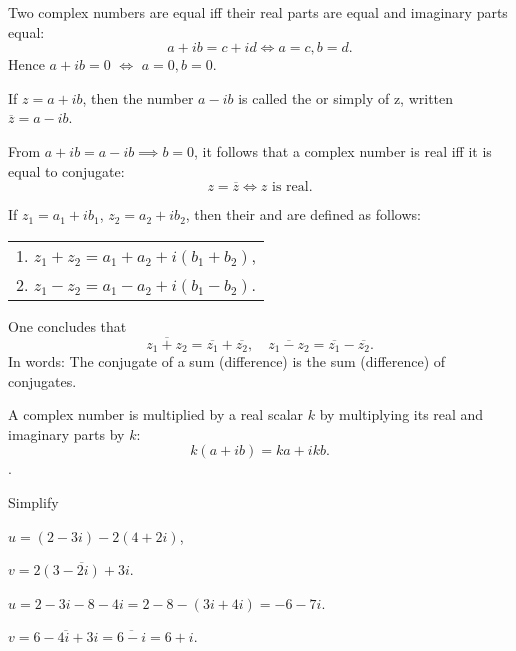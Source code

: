 \documentclass[11pt]{amsbook}
\begin{document}
\begin{defn}[Equality]
	Two complex numbers are equal 
	iff 
	their real parts are equal and imaginary parts equal:
	\[
		a + ib = c + id  
		\iff
		a = c, b = d.
	\]
	Hence $a + ib = 0$ $\iff$  $a = 0, b = 0$.
\end{defn}

\begin{defn}[Conjugation]
	If $z = a + ib$, then the number $a - ib$ is called the 
	 or simply 
	 of z, 
	written $\overline{z} =a - ib$. 
\end{defn}

From $a +ib = a - ib \implies b = 0$, it follows that a complex number is real iff it is equal to conjugate:
\[
	z = \overline{z} 
	\iff 
	z \text{ is real}.
\]

\begin{defn}
	If $z_{1} = a_{1} + ib_{1}$, $z_{2} = a_{2} + ib_{2}$, 
	then their 
	 and 
	are defined as follows:
	\begin{center}
	\begin{tabular}{c}
		1. $z_{1} + z_{2} = a_{1} + a_{2} + i( b_{1} + b_{2} )$,\\
		2. $z_{1} - z_{2} = a_{1} - a_{2} + i( b_{1} - b_{2} )$.
	\end{tabular}
	\end{center}
\end{defn}

One concludes that 
\[
	\overline{ z_{1} + z_{2} } 
	= \overline{z_{1}} + \overline{z_{2}},
	\quad
	\overline{ z_{1} - z_{2} } 
	= \overline{z_{1}} - \overline{z_{2}}.
\]
In words: 
The conjugate of a sum (difference) is the sum (difference) of conjugates.

A complex number is multiplied by a real scalar $k$ 
by multiplying its real and imaginary parts by $k$:
\[
	k(a + ib) = ka + ikb.
\].

\begin{exmp}
	Simplify
	\begin{hEnumerateAlpha}
		\item 
		$u = (2 - 3i) - 2(4 + 2i)$, 
		
		\item 
		$v = \overline{2(3 - 2i) + 3i}$.
	\end{hEnumerateAlpha}
	\begin{hSolution}
		\begin{hEnumerateAlpha}
			
			\item 
			$u 
			= 2 - 3i - 8 - 4i 
			= 2 - 8 - (3i + 4i) 
			= -6 - 7i$. 
			
			\item 
			$v 
			= \overline{6 - 4i + 3i} 
			= \overline{6 - i} 
			= 6 + i$.
		\end{hEnumerateAlpha}
	\end{hSolution}
\end{exmp}
\end{document}
